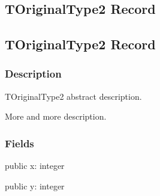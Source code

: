 \documentclass{report}
\newif\ifpdf
\begin{document}
\subsection*{\large{\textbf{TOriginalType2 Record}}\normalsize\hspace{1ex}\hrulefill}
\else
\subsection*{TOriginalType2 Record}
\fi
\label{ok_type_aliases.TOriginalType2}
\subsubsection*{\large{\textbf{Description}}\normalsize\hspace{1ex}\hfill}
TOriginalType2 abstract description.\hfill\vspace*{1ex}

 More and more description.\subsubsection*{\large{\textbf{Fields}}\normalsize\hspace{1ex}\hfill}
\begin{list}{}{
\setlength{\itemindent}{0cm}
\setlength{\listparindent}{0cm}
\setlength{\leftmargin}{\evensidemargin}
\addtolength{\leftmargin}{\tmplength}
\settowidth{\labelsep}{X}
\addtolength{\leftmargin}{\labelsep}
\setlength{\labelwidth}{\tmplength}
}
\label{ok_type_aliases.TOriginalType2-x}
\item[\textbf{x}\hfill]
\ifpdf
\begin{flushleft}
\fi
\begin{ttfamily}
public x: integer \end{ttfamily}

\ifpdf
\end{flushleft}
\fi


\par  \label{ok_type_aliases.TOriginalType2-y}
\item[\textbf{y}\hfill]
\ifpdf
\begin{flushleft}
\fi
\begin{ttfamily}
public y: integer \end{ttfamily}

\ifpdf
\end{flushleft}
\fi


\par  \end{list}
\ifpdf
\end{document}
